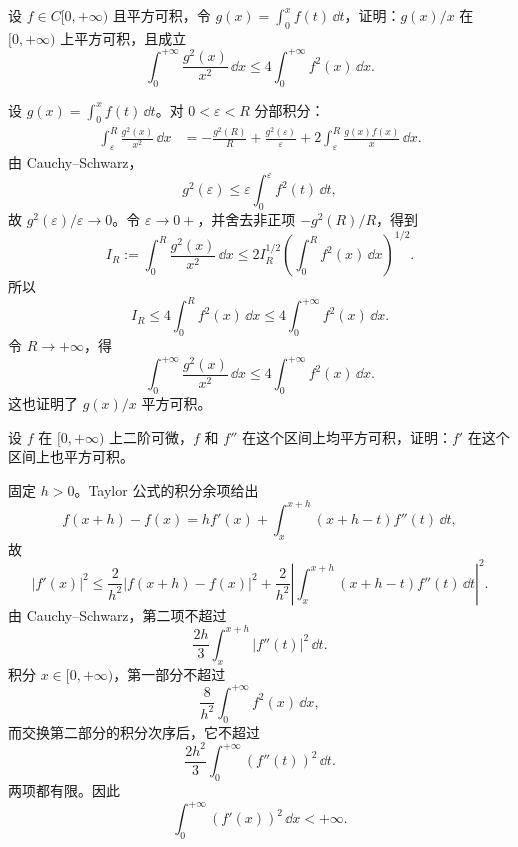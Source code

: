 \begin{xreferenceproblem}[3]
设 $f\in C[0,+\infty)$ 且平方可积，令 $g(x)=\int_0^x f(t)\,\dd t$，证明：$g(x)/x$ 在 $[0,+\infty)$ 上平方可积，且成立
  \[
    \int_0^{+\infty}\frac{g^2(x)}{x^2}\,\dd x\leq4\int_0^{+\infty}f^2(x)\,\dd x.
  \]
\end{xreferenceproblem}
\begin{xsolution}
设 $g(x)=\int_0^x f(t)\,\dd t$。对 $0<\varepsilon<R$ 分部积分：
\begin{align*}
  \int_\varepsilon^R\frac{g^2(x)}{x^2}\,\dd x
  &=-\frac{g^2(R)}R+\frac{g^2(\varepsilon)}\varepsilon
    +2\int_\varepsilon^R\frac{g(x)f(x)}x\,\dd x.
\end{align*}
由 Cauchy--Schwarz，
\[
  g^2(\varepsilon)
  \leq\varepsilon\int_0^\varepsilon f^2(t)\,\dd t,
\]
故 $g^2(\varepsilon)/\varepsilon\to0$。令 $\varepsilon\to0+$，并舍去非正项 $-g^2(R)/R$，得到
\[
  I_R:=\int_0^R\frac{g^2(x)}{x^2}\,\dd x
  \leq2I_R^{1/2}\left(\int_0^R f^2(x)\,\dd x\right)^{1/2}.
\]
所以
\[
  I_R\leq4\int_0^R f^2(x)\,\dd x
  \leq4\int_0^{+\infty}f^2(x)\,\dd x.
\]
令 $R\to+\infty$，得
\[
  \boxed{\int_0^{+\infty}\frac{g^2(x)}{x^2}\,\dd x
  \leq4\int_0^{+\infty}f^2(x)\,\dd x}.
\]
这也证明了 $g(x)/x$ 平方可积。
\end{xsolution}


\begin{xreferenceproblem}[4]
设 $f$ 在 $[0,+\infty)$ 上二阶可微，$f$ 和 $f''$ 在这个区间上均平方可积，证明：$f'$ 在这个区间上也平方可积。
\end{xreferenceproblem}
\begin{xsolution}
固定 $h>0$。Taylor 公式的积分余项给出
\[
  f(x+h)-f(x)
  =hf'(x)+\int_x^{x+h}(x+h-t)f''(t)\,\dd t,
\]
故
\[
  |f'(x)|^2
  \leq\frac{2}{h^2}|f(x+h)-f(x)|^2
  +\frac{2}{h^2}\left|\int_x^{x+h}(x+h-t)f''(t)\,\dd t\right|^2.
\]
由 Cauchy--Schwarz，第二项不超过
\[
  \frac{2h}{3}\int_x^{x+h}|f''(t)|^2\,\dd t.
\]
积分 $x\in[0,+\infty)$，第一部分不超过
\[
  \frac8{h^2}\int_0^{+\infty}f^2(x)\,\dd x,
\]
而交换第二部分的积分次序后，它不超过
\[
  \frac{2h^2}{3}\int_0^{+\infty}(f''(t))^2\,\dd t.
\]
两项都有限。因此
\[
  \boxed{\int_0^{+\infty}(f'(x))^2\,\dd x<+\infty}.
\]
\end{xsolution}


